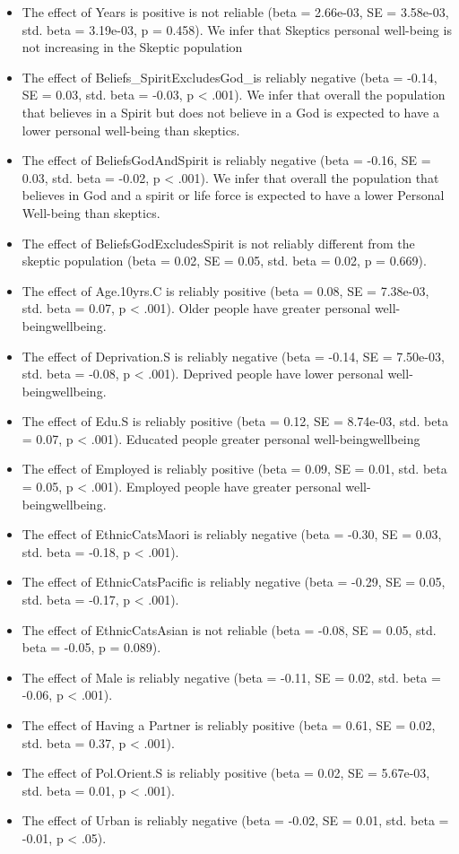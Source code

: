 \documentclass[
  english,
  man]{apa6}
\providecommand{\tightlist}{%
  \setlength{\itemsep}{0pt}\setlength{\parskip}{0pt}}
\begin{document}
\begin{itemize}
\tightlist
\item
  The effect of Years is positive is not reliable (beta = 2.66e-03, SE = 3.58e-03, std. beta = 3.19e-03, p = 0.458). We infer that Skeptics personal well-being is not increasing in the Skeptic population
\item
  The effect of Beliefs\_SpiritExcludesGod\_is reliably negative (beta = -0.14, SE = 0.03, std. beta = -0.03, p \textless{} .001). We infer that overall the population that believes in a Spirit but does not believe in a God is expected to have a lower personal well-being than skeptics.
\item
  The effect of BeliefsGodAndSpirit is reliably negative (beta = -0.16, SE = 0.03, std. beta = -0.02, p \textless{} .001). We infer that overall the population that believes in God and a spirit or life force is expected to have a lower Personal Well-being than skeptics.
\item
  The effect of BeliefsGodExcludesSpirit is not reliably different from the skeptic population (beta = 0.02, SE = 0.05, std. beta = 0.02, p = 0.669).
\item
  The effect of Age.10yrs.C is reliably positive (beta = 0.08, SE = 7.38e-03, std. beta = 0.07, p \textless{} .001). Older people have greater personal well-beingwellbeing.
\item
  The effect of Deprivation.S is reliably negative (beta = -0.14, SE = 7.50e-03, std. beta = -0.08, p \textless{} .001). Deprived people have lower personal well-beingwellbeing.
\item
  The effect of Edu.S is reliably positive (beta = 0.12, SE = 8.74e-03, std. beta = 0.07, p \textless{} .001). Educated people greater personal well-beingwellbeing
\item
  The effect of Employed is reliably positive (beta = 0.09, SE = 0.01, std. beta = 0.05, p \textless{} .001). Employed people have greater personal well-beingwellbeing.
\item
  The effect of EthnicCatsMaori is reliably negative (beta = -0.30, SE = 0.03, std. beta = -0.18, p \textless{} .001).
\item
  The effect of EthnicCatsPacific is reliably negative (beta = -0.29, SE = 0.05, std. beta = -0.17, p \textless{} .001).
\item
  The effect of EthnicCatsAsian is not reliable (beta = -0.08, SE = 0.05, std. beta = -0.05, p = 0.089).
\item
  The effect of Male is reliably negative (beta = -0.11, SE = 0.02, std. beta = -0.06, p \textless{} .001).
\item
  The effect of Having a Partner is reliably positive (beta = 0.61, SE = 0.02, std. beta = 0.37, p \textless{} .001).
\item
  The effect of Pol.Orient.S is reliably positive (beta = 0.02, SE = 5.67e-03, std. beta = 0.01, p \textless{} .001).
\item
  The effect of Urban is reliably negative (beta = -0.02, SE = 0.01, std. beta = -0.01, p \textless{} .05).
\end{itemize}
\end{document}
